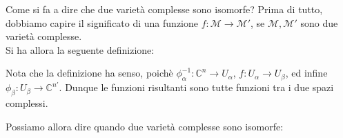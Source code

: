 \documentclass{report}
\begin{document}
Come si fa a dire che due varietà complesse sono isomorfe? Prima di tutto, dobbiamo capire il significato di una funzione \(f: \mathcal{M} \rightarrow \mathcal{M}'\), se \(\mathcal{M}, \mathcal{M}'\) sono due varietà complesse. \\

Si ha allora la seguente definizione: 


Nota che la definizione ha senso, poichè \(\phi^{-1}_\alpha : \mathbb{C}^n \rightarrow U_\alpha\), \(f: U_\alpha \rightarrow U_\beta\), ed infine \(\phi_\beta : U_\beta \rightarrow \mathbb{C}^{n'}\). Dunque le funzioni risultanti sono tutte funzioni tra i due spazi complessi.  

Possiamo allora dire quando due varietà complesse sono isomorfe: 

\end{document}
